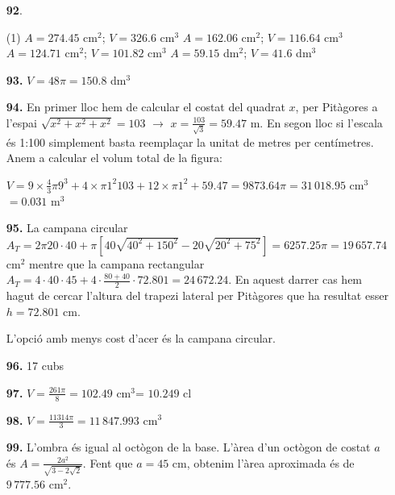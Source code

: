 \documentclass[a4paper, pdf, twoside]{book}
\begin{document}
\begin{multicols}{2}
\begin{enumerate}
 \item[\fontfamily{phv}\selectfont\color{blue}\textbf{92}. ] 
 \begin{tasks}[column-sep=1em, item-indent=1.3333em](1)
	 \task* $A=274.45$ cm$^2$; $V=326.6$ cm$^3$
	 \task* $A=162.06$ cm$^2$; $V=116.64$ cm$^3$
	 \task* $A=124.71$ cm$^2$; $V=101.82$ cm$^3$
	 \task* $A=59.15$ dm$^2$; $V=41.6$ dm$^3$
\end{tasks}
 \end{enumerate}
\begin{enumerate}
\vspace{0.25cm}
\item[\fontfamily{phv}\selectfont\color{blue}\textbf{93. }] 
$V=48\pi =150.8$ dm$^3$
\vspace{0.25cm}
\item[\fontfamily{phv}\selectfont\color{blue}\textbf{94. }] 
En primer lloc hem de calcular el costat del quadrat $x$, per Pitàgores a l'espai $\sqrt {x^2+x^2+x^2}=103$ $\rightarrow $ $x=\frac {103}{\sqrt {3}}=59.47$ m. En segon lloc si l'escala és 1:100 simplement basta reemplaçar la unitat de metres per centímetres. Anem a calcular el volum total de la figura:\par $V=9 \times \frac {4}{3}\pi 9^3+4\times \pi 1^2 103 + 12 \times \pi 1^2 + 59.47 =9873.64 \pi = 31\,018.95$ cm$^3$ $=0.031$ m$^3$
\vspace{0.25cm}
\item[\fontfamily{phv}\selectfont\color{blue}\textbf{95. }] 
La campana circular $A_T=2\pi 20\cdot 40 + \pi \left [ 40\sqrt {40^2+150^2} - 20\sqrt {20^2+75^2} \right ]=6257.25\pi =19\,657.74$ cm$^2$ mentre que la campana rectangular $A_T=4\cdot 40\cdot 45 + 4 \cdot \frac {80+40}{2}\cdot 72.801=24\,672.24$. En aquest darrer cas hem hagut de cercar l'altura del trapezi lateral per Pitàgores que ha resultat esser $h=72.801$ cm.\par L'opció amb menys cost d'acer és la campana circular.
\vspace{0.25cm}
\item[\fontfamily{phv}\selectfont\color{blue}\textbf{96. }] 
17 cubs
\vspace{0.25cm}
\item[\fontfamily{phv}\selectfont\color{blue}\textbf{97. }] 
$V=\frac {261\pi }{8}=102.49$ cm$^3$= $10.249$ cl
\vspace{0.25cm}
\item[\fontfamily{phv}\selectfont\color{blue}\textbf{98. }] 
$V=\frac {11314 \pi }{3}=11\,847.993$ cm$^3$
\vspace{0.25cm}
\item[\fontfamily{phv}\selectfont\color{blue}\textbf{99. }] 
L'ombra és igual al octògon de la base. L'àrea d'un octògon de costat $a$ és $A=\frac {2a^2}{\sqrt {3-2\sqrt {2}}}$. Fent que $a=45$ cm, obtenim l'àrea aproximada és de $9\,777.56$ cm$^2$.
 \end{enumerate}
\vspace{0.3cm}


\end{multicols}
\end{document}
